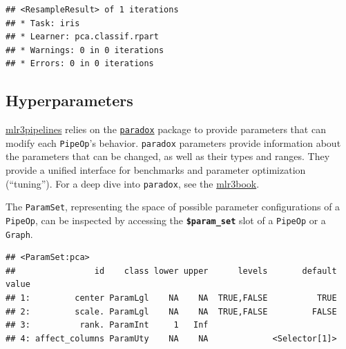 \documentclass[]{scrbook}
\newenvironment{Shaded}{\begin{snugshade}}{\end{snugshade}}
\newcommand{\KeywordTok}[1]{\textcolor[rgb]{0.13,0.29,0.53}{\textbf{#1}}}
\newcommand{\NormalTok}[1]{#1}
\newcommand{\OperatorTok}[1]{\textcolor[rgb]{0.81,0.36,0.00}{\textbf{#1}}}
\newcommand{\StringTok}[1]{\textcolor[rgb]{0.31,0.60,0.02}{#1}}
\renewenvironment{Shaded} {\begin{snugshade}\small} {\end{snugshade}}
\begin{document}
\begin{Shaded}
\end{Shaded}

\begin{verbatim}
## <ResampleResult> of 1 iterations
## * Task: iris
## * Learner: pca.classif.rpart
## * Warnings: 0 in 0 iterations
## * Errors: 0 in 0 iterations
\end{verbatim}

\hypertarget{hyperparameters}{%
\subsection{Hyperparameters}\label{hyperparameters}}

\href{https://cran.r-project.org/package=mlr3pipelines}{mlr3pipelines} relies on the \href{https://paradox.mlr-org.com}{\texttt{paradox}} package to provide parameters that can modify each \texttt{PipeOp}'s behavior.
\texttt{paradox} parameters provide information about the parameters that can be changed, as well as their types and ranges.
They provide a unified interface for benchmarks and parameter optimization (``tuning'').
For a deep dive into \texttt{paradox}, see the \href{https://mlr3book.mlr-org.com}{mlr3book}.

The \texttt{ParamSet}, representing the space of possible parameter configurations of a \texttt{PipeOp}, can be inspected by accessing the \textbf{\texttt{\$param\_set}} slot of a \texttt{PipeOp} or a \texttt{Graph}.

\begin{Shaded}
\end{Shaded}

\begin{verbatim}
## <ParamSet:pca>
##                id    class lower upper      levels       default value
## 1:         center ParamLgl    NA    NA  TRUE,FALSE          TRUE      
## 2:         scale. ParamLgl    NA    NA  TRUE,FALSE         FALSE      
## 3:          rank. ParamInt     1   Inf                                
## 4: affect_columns ParamUty    NA    NA             <Selector[1]>
\end{verbatim}
\end{document}
